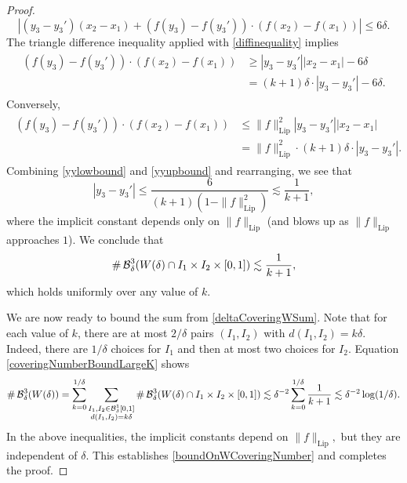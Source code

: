 \begin{proof}
	\begin{equation} \label{diffinequality}
		\left| \left( y_3 - y_3' \right) (x_2 - x_1) + (f(y_3) - f(y_3')) \cdot (f(x_2) - f(x_1)) \right| \leq 6\delta.
	\end{equation}
	The triangle difference inequality applied with \eqref{diffinequality} implies
	\begin{align} \label{yylowbound}
	\begin{split}
		(f(y_3) - f(y_3')) \cdot (f(x_2) - f(x_1)) &\geq |y_3 - y_3'||x_2-x_1| - 6\delta\\ &= (k+1)\delta \cdot |y_3 - y_3'| - 6 \delta.
	\end{split}
	\end{align}
	Conversely,
	\begin{align} \label{yyupbound}
	\begin{split}
		(f(y_3) - f(y_3')) \cdot (f(x_2) - f(x_1)) &\leq \| f \|_{\text{Lip}}^2 |y_3 - y_3'| |x_2 - x_1| \\ &=  \| f \|_{\text{Lip}}^2 \cdot (k+1) \delta \cdot |y_3 - y_3'|.
	\end{split}
	\end{align}
Combining \eqref{yylowbound} and \eqref{yyupbound} and rearranging, we see that
	\begin{equation}\label{y3minusY3Prime} |y_3 - y_3'| \leq \frac{6}{(k+1)(1 - \| f \|_{\text{Lip}}^2)}  \lesssim\frac{1}{k+1},
	 \end{equation} 
	where the implicit constant depends only on $\| f \|_{\text{Lip}}$ (and blows up as $\| f \|_{\text{Lip}}$ approaches $1$).  We conclude that
	\begin{equation}\label{coveringNumberBoundLargeK} \# \operatorname{\mathcal{B}}^3_\delta(W(\delta) \cap I_1 \times I_2 \times [0,1]) \lesssim \frac{1}{k+1},\end{equation} 
which holds uniformly over any value of $k$.

We are now ready to bound the sum from \eqref{deltaCoveringWSum}. Note that for each value of $k$, there are at most $2/\delta$ pairs $(I_1,I_2)$ with $d(I_1,I_2) = k \delta$. Indeed, there are $1/\delta$ choices for $I_1$ and then at most two choices for $I_2$. Equation  \eqref{coveringNumberBoundLargeK} shows 
	\begin{align*}
		\# \operatorname{\mathcal{B}}^3_\delta(W(\delta)) = \sum_{k = 0}^{1/\delta} \sum_{\substack{I_1, I_2 \in \operatorname{\mathcal{B}}^1_\delta[0,1]\\d(I_1,I_2) = k\delta}} \# \operatorname{\mathcal{B}}^3_\delta(W(\delta) \cap I_1 \times I_2 \times [0,1])
		\lesssim \delta^{-2} \sum_{k = 0}^{1/\delta} \frac{1}{k+1}
		\lesssim \delta^{-2}\log(1/\delta).
	\end{align*}
In the above inequalities, the implicit constants depend on $\| f \|_{\text{Lip}},$ but they are independent of $\delta$. This establishes \eqref{boundOnWCoveringNumber} and completes the proof.
\end{proof}

\endinput
